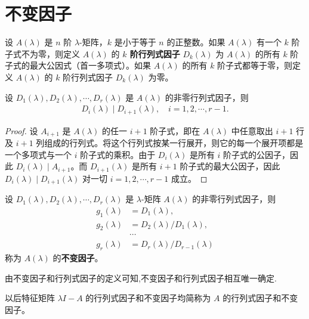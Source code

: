 \documentclass[../../main.tex]{subfiles}%
\begin{document}
\section{不变因子}

\begin{definition}[$k$阶行列式因子]
设 $A(\lambda)$ 是 $n$ 阶 $\lambda$-矩阵，$k$ 是小于等于 $n$ 的正整数。如果 $A(\lambda)$ 有一个 $k$ 阶子式不为零，则定义 $A(\lambda)$ 的 \textbf{$k$ 阶行列式因子} $D_k(\lambda)$ 为 $A(\lambda)$ 的所有 $k$ 阶子式的最大公因式（首一多项式）。如果 $A(\lambda)$ 的所有 $k$ 阶子式都等于零，则定义 $A(\lambda)$ 的 $k$ 阶行列式因子 $D_k(\lambda)$ 为零。 
\end{definition}

\begin{lemma}\label{lemma:i阶行列式因子整除i+1阶行列式因子}
设 $D_1(\lambda), D_2(\lambda), \cdots, D_r(\lambda)$ 是 $A(\lambda)$ 的非零行列式因子，则
\begin{align*}
D_i(\lambda)\mid D_{i + 1}(\lambda),\quad i = 1, 2, \cdots, r - 1.
\end{align*}
\end{lemma}
\begin{proof}

设 $A_{i + 1}$ 是 $A(\lambda)$ 的任一 $i + 1$ 阶子式，即在 $A(\lambda)$ 中任意取出 $i + 1$ 行及 $i + 1$ 列组成的行列式。将这个行列式按某一行展开，则它的每一个展开项都是一个多项式与一个 $i$ 阶子式的乘积。由于 $D_i(\lambda)$ 是所有 $i$ 阶子式的公因子，因此 $D_i(\lambda)\mid A_{i + 1}$。而 $D_{i + 1}(\lambda)$ 是所有 $i + 1$ 阶子式的最大公因子，因此 $D_i(\lambda)\mid D_{i + 1}(\lambda)$ 对一切 $i = 1, 2, \cdots, r - 1$ 成立。 

\end{proof}

\begin{definition}[不变因子]
设 $D_1(\lambda), D_2(\lambda), \cdots, D_r(\lambda)$ 是 $\lambda$-矩阵 $A(\lambda)$ 的非零行列式因子，则
\begin{align*}
g_1(\lambda)&=D_1(\lambda),\\
g_2(\lambda)&=D_2(\lambda)/D_1(\lambda),\\
&\cdots\\
g_r(\lambda)&=D_r(\lambda)/D_{r - 1}(\lambda)
\end{align*}
称为 $A(\lambda)$ 的\textbf{不变因子}。 
\end{definition}
\begin{note}
由不变因子和行列式因子的定义可知,不变因子和行列式因子相互唯一确定.
\end{note}
\begin{remark}
以后特征矩阵 $\lambda I - A$ 的行列式因子和不变因子均简称为 $A$ 的行列式因子和不变因子。 
\end{remark}
\end{document}
